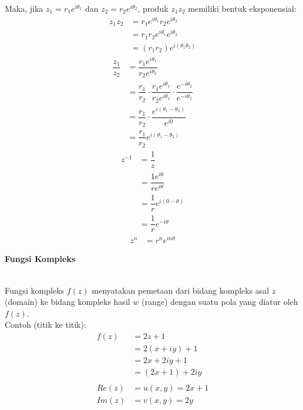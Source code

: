 \documentclass{article}
\begin{document}
    Maka, jika $z_1 = r_1e^{i\theta_1}$ dan $z_2 = r_2e^{i\theta_2}$, produk $z_1z_2$ memiliki bentuk eksponensial:
    \begin{align}
        z_1z_2  &= r_1e^{i\theta_1} r_2e^{i\theta_2}
                \nonumber\\
                &= r_1r_2e^{i\theta_1}e^{i\theta_2}
                \nonumber\\
                &= (r_1r_2)e^{i(\theta_1\theta_2)}
    \end{align}
    \begin{align}
        \dfrac{z_1}{z_2}    &= \dfrac{r_1e^{i\theta_1}}{r_2e^{i\theta_2}}
                            \nonumber\\
                            &= \dfrac{r_1}{r_2} \cdot \dfrac{r_1e^{i\theta_1}}{r_2e^{i\theta_2}} \cdot \dfrac{e^{-i\theta_2}}{e^{-i\theta_2}}
                            \nonumber\\
                            &= \dfrac{r_1}{r_2} \cdot \dfrac{e^{i(\theta_1-\theta_2)}}{e^{i0}}
                            \nonumber\\
                            &= \dfrac{r_1}{r_2} e^{i(\theta_1-\theta_2)}
    \end{align}
    \begin{align}
        z^{-1}  &= \dfrac{1}{z}
                \nonumber\\
                &= \dfrac{1e^{i0}}{re^{i\theta}}
                \nonumber\\
                &= \dfrac{1}{r} e^{i(0-\theta)}
                \nonumber\\
                &= \dfrac{1}{r} e^{-i\theta}
    \end{align}
    \begin{align}
        z^n &= r^n e^{in\theta}
    \end{align}

    \newpage
    \begin{center}
        \textbf{Fungsi Kompleks}
    \end{center}
    \leavevmode\\

    Fungsi kompleks $f(z)$ menyatakan pemetaan dari bidang kompleks asal $z$ (domain) ke bidang kompleks hasil $w$ (range) dengan suatu pola yang diatur oleh $f(z)$.
    \\

    Contoh (titik ke titik):
    \begin{align}
        f(z)    &= 2z + 1
                \nonumber\\
                &= 2(x+iy) + 1
                \nonumber\\
                &= 2x + 2iy + 1
                \nonumber\\
                &= (2x + 1) + 2iy
                \\\nonumber\\
        Re(z)   &= u(x,y) = 2x + 1
                \nonumber\\
        Im(z)   &= v(x,y) = 2y
                \nonumber
    \end{align}
    
\end{document}
